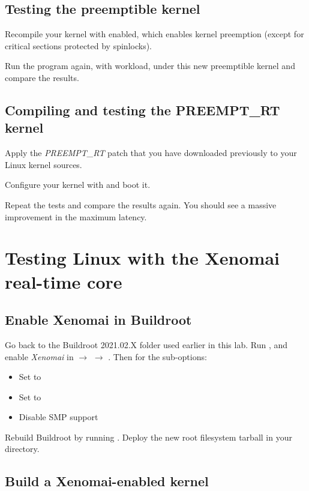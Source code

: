\subsection{Testing the preemptible kernel}

Recompile your kernel with  enabled, which
enables kernel preemption (except for critical sections protected by
spinlocks).

Run the  program again, with workload, under this new
preemptible kernel and compare the results.

\subsection{Compiling and testing the PREEMPT\_RT kernel}

Apply the {\em PREEMPT\_RT} patch that you have downloaded previously
to your Linux kernel sources.

Configure your kernel with  and boot it.

Repeat the tests and compare the results again. You should see a massive
improvement in the maximum latency.

\section{Testing Linux with the Xenomai real-time core}

\subsection{Enable Xenomai in Buildroot}

Go back to the Buildroot 2021.02.X folder used earlier in this lab. Run
, and enable {\em Xenomai} in  $\rightarrow$  $\rightarrow$ . Then for the sub-options:

\begin{itemize}
\item Set  to 
\item Set  to 
\item Disable SMP support
\end{itemize}

Rebuild Buildroot by running . Deploy the new root
filesystem tarball in your  directory.

\subsection{Build a Xenomai-enabled kernel}

